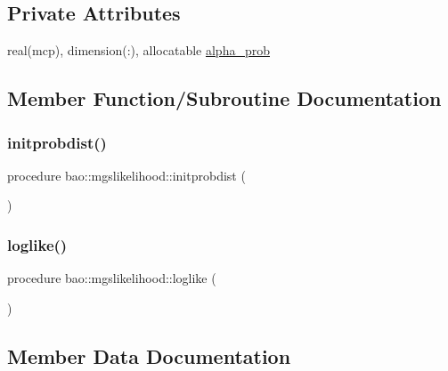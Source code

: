 \subsection*{Private Attributes}
\begin{DoxyCompactItemize}
\item 
real(mcp), dimension(\+:), allocatable \mbox{\hyperlink{structbao_1_1mgslikelihood_ae8bef0305bccc2b1c99c389166112b1a}{alpha\+\_\+prob}}
\end{DoxyCompactItemize}


\subsection{Member Function/\+Subroutine Documentation}
\mbox{\label{structbao_1_1mgslikelihood_a53b7049278f2fd93e079b973bbeb4d22}} 
\subsubsection{\texorpdfstring{initprobdist()}{initprobdist()}}
{\footnotesize\ttfamily procedure bao\+::mgslikelihood\+::initprobdist (\begin{DoxyParamCaption}{ }\end{DoxyParamCaption})\hspace{0.3cm}{\ttfamily [private]}}

\mbox{\label{structbao_1_1mgslikelihood_ad5a6fafb8449b5861a24eb9d3382510e}} 
\subsubsection{\texorpdfstring{loglike()}{loglike()}}
{\footnotesize\ttfamily procedure bao\+::mgslikelihood\+::loglike (\begin{DoxyParamCaption}{ }\end{DoxyParamCaption})\hspace{0.3cm}{\ttfamily [private]}}



\subsection{Member Data Documentation}
\mbox{\label{structbao_1_1mgslikelihood_ae8bef0305bccc2b1c99c389166112b1a}} 
